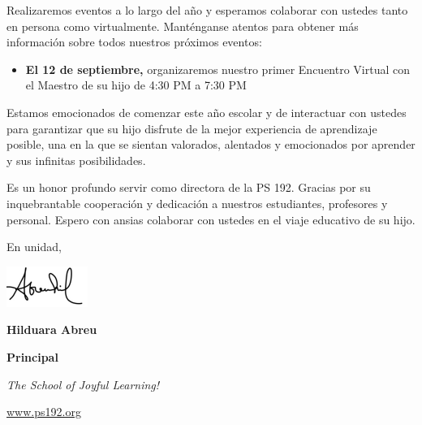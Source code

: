 \documentclass[letterpaper, 12pt]{article}
\begin{document}
Realizaremos eventos a lo largo del año y esperamos colaborar con ustedes tanto en persona como virtualmente. Manténganse atentos para obtener más información sobre todos nuestros próximos eventos:
\begin{itemize}
\item \textbf{El 12 de septiembre,} organizaremos nuestro primer Encuentro Virtual con el Maestro de su hijo de 4:30 PM a 7:30 PM
\end{itemize}

Estamos emocionados de comenzar este año escolar y de interactuar con ustedes para garantizar que su hijo disfrute de la mejor experiencia de aprendizaje posible, una en la que se sientan valorados, alentados y emocionados por aprender y sus infinitas posibilidades.

Es un honor profundo servir como directora de la PS 192. Gracias por su inquebrantable cooperación y dedicación a nuestros estudiantes, profesores y personal. Espero con ansias colaborar con ustedes en el viaje educativo de su hijo.

En unidad,

\includegraphics[width=100px,height=50px]{hil_signature.png}

\textbf{Hilduara Abreu}

\textbf{Principal}

\textit{The School of Joyful Learning!}

\href{https://www.ps192.org}{www.ps192.org}
\end{document}
